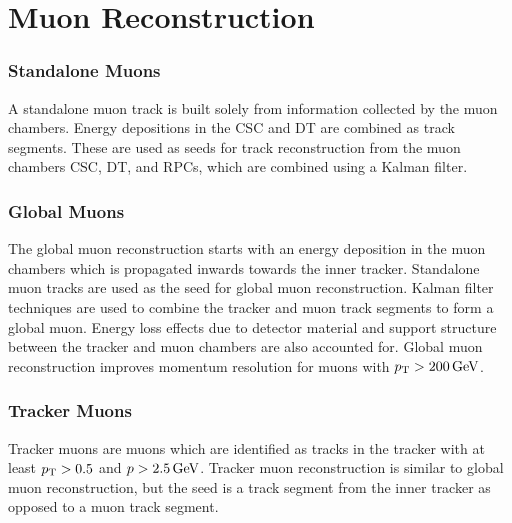 \section{Muon Reconstruction}\label{ch:reco:muon}

\subsubsection{Standalone Muons}
A standalone muon track is built solely from information collected by the muon chambers. Energy depositions in the CSC and DT are combined as track segments. These are used as seeds for track reconstruction from the muon chambers CSC, DT, and RPCs, which are combined using a Kalman filter\cite{Sirunyan:2018fpa}. 

\subsubsection{Global Muons}
The global muon reconstruction starts with an energy deposition in the muon chambers which is propagated inwards towards the inner tracker. Standalone muon tracks are used as the seed for global muon reconstruction. Kalman filter techniques are used to combine the tracker and muon track segments to form a global muon. Energy loss effects due to detector material and support structure between the tracker and muon chambers are also accounted for. Global muon reconstruction improves momentum resolution for muons with $p_{\mathrm{T}} > 200 \,\text{Ge\hspace{-.08em}V}$.

\subsubsection{Tracker Muons}
Tracker muons are muons which are identified as tracks in the tracker with at least $p_{\mathrm{T}} > 0.5$ and $p > 2.5\,\text{Ge\hspace{-.08em}V}$. Tracker muon reconstruction is similar to global muon reconstruction, but the seed is a track segment from the inner tracker as opposed to a muon track segment.



